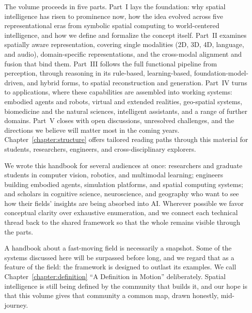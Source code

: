The volume proceeds in five parts.
Part~I lays the foundation: why spatial intelligence has risen to prominence now, how the idea evolved across five representational eras from symbolic spatial computing to world-centered intelligence, and how we define and formalize the concept itself.
Part~II examines spatially aware representation, covering single modalities (2D, 3D, 4D, language, and audio), domain-specific representations, and the cross-modal alignment and fusion that bind them.
Part~III follows the full functional pipeline from perception, through reasoning in its rule-based, learning-based, foundation-model-driven, and hybrid forms, to spatial reconstruction and generation.
Part~IV turns to applications, where these capabilities are assembled into working systems: embodied agents and robots, virtual and extended realities, geo-spatial systems, biomedicine and the natural sciences, intelligent assistants, and a range of further domains.
Part~V closes with open discussions, unresolved challenges, and the directions we believe will matter most in the coming years.
Chapter~\ref{chapter:structure} offers tailored reading paths through this material for students, researchers, engineers, and cross-disciplinary explorers.

We wrote this handbook for several audiences at once: researchers and graduate students in computer vision, robotics, and multimodal learning; engineers building embodied agents, simulation platforms, and spatial computing systems; and scholars in cognitive science, neuroscience, and geography who want to see how their fields' insights are being absorbed into AI.
Wherever possible we favor conceptual clarity over exhaustive enumeration, and we connect each technical thread back to the shared framework so that the whole remains visible through the parts.

A handbook about a fast-moving field is necessarily a snapshot.
Some of the systems discussed here will be surpassed before long, and we regard that as a feature of the field: the framework is designed to outlast its examples.
We call Chapter~\ref{chapter:definition} ``A Definition in Motion'' deliberately.
Spatial intelligence is still being defined by the community that builds it, and our hope is that this volume gives that community a common map, drawn honestly, mid-journey.

\clearpage
